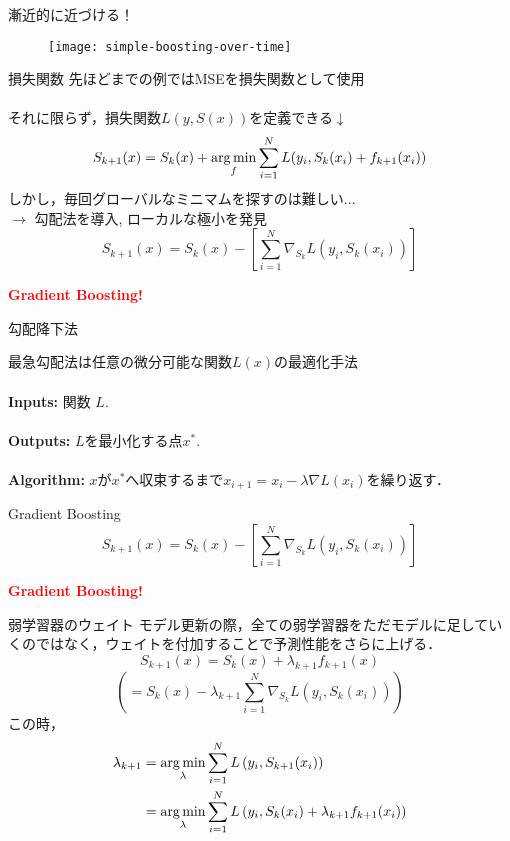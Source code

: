 \begin{frame}{漸近的に近づける！}

  \begin{figure}
    \texttt{[image: simple-boosting-over-time]}
  \end{figure}
  
\end{frame}
%

\begin{frame}{損失関数}
先ほどまでの例ではMSEを損失関数として使用\\~\\
それに限らず，損失関数$L\left(y, S(x)\right)$を定義できる$\downarrow$
$$S_{k + 1}(x) = S_k(x) + \operatorname*{arg\,min}_{f} \sum^N_{i=1}L(y_i, S_k(x_i) + f_{k+1}(x_i))$$
しかし，毎回グローバルなミニマムを探すのは難しい...\\
$\to$ 勾配法を導入, ローカルな極小を発見
$$S_{k + 1}(x) = S_k(x) - \left[\sum^N_{i=1}\nabla_{S_k}L(y_i, S_k(x_i))\right]$$
\begin{center}
  \textbf{\textcolor{red}{Gradient Boosting!}}
\end{center}

\end{frame}
%


\begin{frame}{勾配降下法}

最急勾配法は任意の微分可能な関数$L(x)$の最適化手法 \\~\\

\textbf{Inputs:} 関数 $L$. \\~\\

\textbf{Outputs:} $L$を最小化する点$x^*$. \\~\\

\textbf{Algorithm:} $x$が$x^*$へ収束するまで$x_{i+1} = x_i - \lambda \nabla L(x_i)$を繰り返す．


\end{frame}
%

\begin{frame}{Gradient Boosting}
$$S_{k + 1}(x) = S_k(x) - \left[\sum^N_{i=1}\nabla_{S_k}L(y_i, S_k(x_i))\right]$$
\begin{center}
  \textbf{\textcolor{red}{Gradient Boosting!}}
\end{center}

\end{frame}
%


\begin{frame}{弱学習器のウェイト}
モデル更新の際，全ての弱学習器をただモデルに足していくのではなく，ウェイトを付加することで予測性能をさらに上げる．
$$S_{k+1}(x) = S_k(x) + \lambda_{k+1} f_{k+1}(x)$$
$$\left ( = S_k(x) - \lambda_{k+1} \sum^N_{i=1} \nabla_{S_k} L(y_i, S_k(x_i)) \right )$$
この時，
\begin{align*}
\lambda_{k+1} &= \operatorname*{arg\,min}_{\lambda} \sum^{N}_{i = 1}L\left(y_i, S_{k+1}(x_i)\right) \\
& =\operatorname*{arg\,min}_{\lambda} \sum^{N}_{i = 1}L\left(y_i, S_k(x_i) + \lambda_{k+1} f_{k+1}(x_i)\right)
\end{align*}
\end{frame}
%

